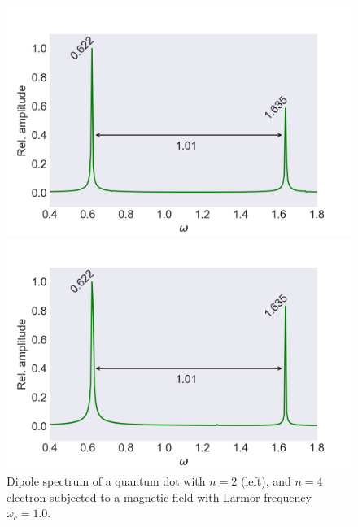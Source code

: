 \begin{figure}[!h]
    \centering
    \begin{minipage}{0.49\textwidth}
        \includegraphics[clip=2em 0em 10em 0em, width=\textwidth]
        {results/figures/B_field/n=2/b_spectrum_omc100.png}
    \end{minipage}\hfill 
    \begin{minipage}{0.49\textwidth}
        \includegraphics[clip=0em 0em 10em 0em, width=\textwidth]
        {results/figures/B_field/n=4/b_spectrum_n=4_omc=100.png}
    \end{minipage}
    \caption{Dipole spectrum of a quantum dot with $n=2$ (left), and $n=4$ electron 
    subjected to a magnetic field with Larmor frequency $\omega_c=1.0$.}
    \label{fig:b_omc100}
\end{figure}